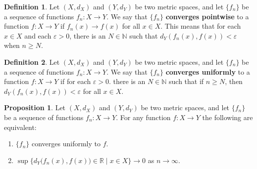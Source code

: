 \documentclass{article}
\theoremstyle{definition}
\newtheorem{prop}{Proposition}[section]
\newtheorem{definition}{Definition}[section]
\theoremstyle{remark}
\theoremstyle{definition}
\begin{document}
\begin{definition} \label{df:3.2}
    Let $(X, d_X)$ and $(Y,d_Y)$ be two metric spaces, and let $\{f_n\}$ be a sequence of functions $f_n\colon X\rightarrow Y$. We say that $\{f_n\}$ \textbf{converges pointwise} to a function $f\colon X\rightarrow Y$ if $f_n(x)\rightarrow f(x)$ for all $x\in X$. This means that for each $x\in X$ and each $\varepsilon>0$, there is an $N\in\mathbb{N}$ such that $d_Y(f_n(x),f(x))<\varepsilon$ when $n\geq N$. 
\end{definition}

\begin{definition} \label{df:3.3}
    Let $(X, d_X)$ and $(Y,d_Y)$ be two metric spaces, and let $\{f_n\}$ be a sequence of functions $f_n\colon X\rightarrow Y$. We say that $\{f_n\}$ \textbf{converges uniformly} to a function $f\colon X\rightarrow Y$ if for each $\varepsilon>0$. there is an $N\in\mathbb{N}$ such that if $n\geq N$, then $d_Y(f_n(x),f(x))<\varepsilon$ for all $x\in X$.   
\end{definition}

\begin{prop} \label{prop:3.1}
    Let $(X,d_X)$ and $(Y,d_Y)$ be two metric spaces, and let $\{f_n\}$ be a sequence of functions $f_n\colon X\rightarrow Y$. For any function $f\colon X\rightarrow Y$ the following are equivalent:
    
    \begin{enumerate}[label=(\roman*)]
        \item $\{f_n\}$ converges uniformly to $f$.
        \item $\sup\{d_Y\big(f_n(x),f(x)\big)\in\mathbb{R}\mid x\in X\}\rightarrow 0$ as $n\rightarrow\infty$.
    \end{enumerate}
\end{prop}
\end{document}
